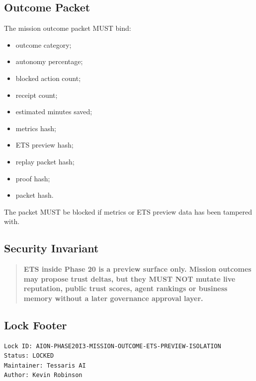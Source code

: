 \subsection{Outcome Packet}

The mission outcome packet MUST bind:

\begin{itemize}
  \item outcome category;
  \item autonomy percentage;
  \item blocked action count;
  \item receipt count;
  \item estimated minutes saved;
  \item metrics hash;
  \item ETS preview hash;
  \item replay packet hash;
  \item proof hash;
  \item packet hash.
\end{itemize}

The packet MUST be blocked if metrics or ETS preview data has been tampered with.

\subsection{Security Invariant}

\begin{quote}
\textbf{ETS inside Phase 20 is a preview surface only. Mission outcomes may propose trust deltas, but they MUST NOT mutate live reputation, public trust scores, agent rankings or business memory without a later governance approval layer.}
\end{quote}

\subsection{Lock Footer}

\begin{verbatim}
Lock ID: AION-PHASE20I3-MISSION-OUTCOME-ETS-PREVIEW-ISOLATION
Status: LOCKED
Maintainer: Tessaris AI
Author: Kevin Robinson
\end{verbatim}
